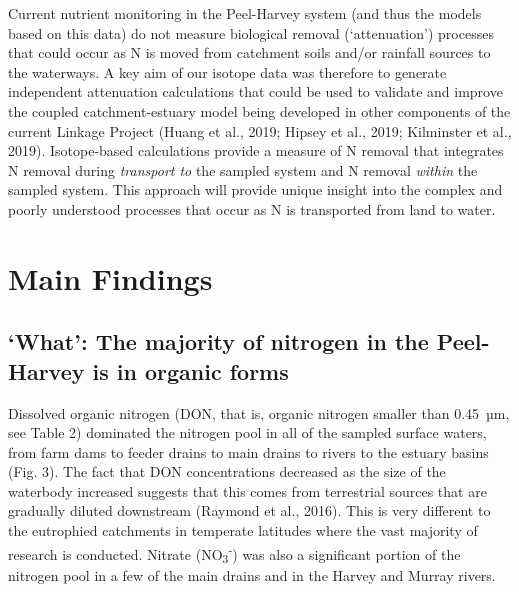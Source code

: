 \documentclass[
]{book}
\begin{document}
Current nutrient monitoring in the Peel-Harvey system (and thus the models based on this data) do not measure biological removal (`attenuation') processes that could occur as N is moved from catchment soils and/or rainfall sources to the waterways. A key aim of our isotope data was therefore to generate independent attenuation calculations that could be used to validate and improve the coupled catchment-estuary model being developed in other components of the current Linkage Project (Huang et al., 2019; Hipsey et al., 2019; Kilminster et al., 2019). Isotope-based calculations provide a measure of N removal that integrates N removal during \emph{transport to} the sampled system and N removal \emph{within} the sampled system. This approach will provide unique insight into the complex and poorly understood processes that occur as N is transported from land to water.~

\hypertarget{main-findings-4}{%
\section{Main Findings}\label{main-findings-4}}

\hypertarget{what-the-majority-of-nitrogen-in-the-peel-harvey-is-in-organic-forms}{%
\subsection{`What': The majority of nitrogen in the Peel-Harvey is in organic forms}\label{what-the-majority-of-nitrogen-in-the-peel-harvey-is-in-organic-forms}}

Dissolved organic nitrogen (DON, that is, organic nitrogen smaller than 0.45~µm, see Table 2) dominated the nitrogen pool in all of the sampled surface waters, from farm dams to feeder drains to main drains to rivers to the estuary basins (Fig. 3). The fact that DON concentrations decreased as the size of the waterbody increased suggests that this comes from terrestrial sources that are gradually diluted downstream (Raymond et al., 2016). This is very different to the eutrophied catchments in temperate latitudes where the vast majority of research is conducted. Nitrate (NO\textsubscript{3}\textsuperscript{-}) was also a significant portion of the nitrogen pool in a few of the main drains and in the Harvey and Murray rivers.~
\end{document}
